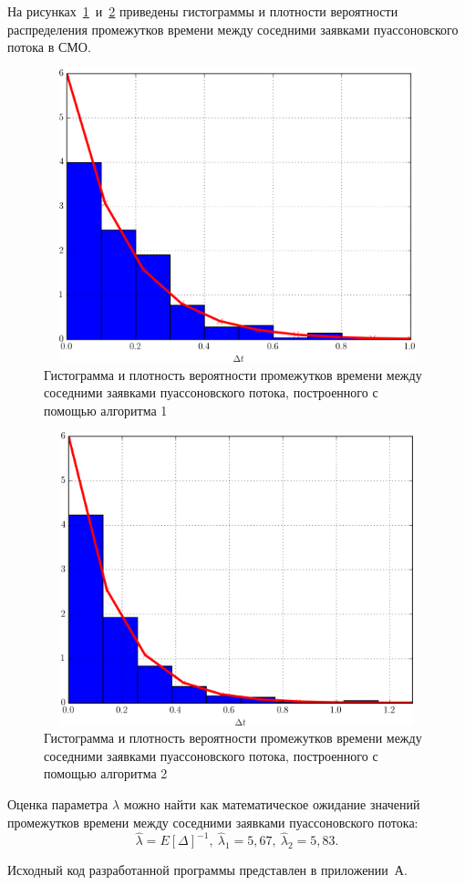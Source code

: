 На рисунках~\ref{pic:hist_1}~и~\ref{pic:hist_2} приведены гистограммы и плотности вероятности распределения промежутков времени между соседними заявками пуассоновского потока в СМО.

\begin{figure}[h!]
  \centering
  \includegraphics[width=150mm, height=85mm]{pic/hist_1}
  \caption{Гистограмма и плотность вероятности промежутков времени
    между соседними заявками пуассоновского потока,
    построенного с помощью алгоритма 1}
  \label{pic:hist_1}
\end{figure}

\begin{figure}[h!]
  \centering
  \includegraphics[width=150mm, height=85mm]{pic/hist_2}
  \caption{Гистограмма и плотность вероятности промежутков времени 
    между соседними заявками пуассоновского потока, 
    построенного с помощью алгоритма 2}
  \label{pic:hist_2}
\end{figure}

Оценка параметра $\lambda$ можно найти как математическое ожидание
значений промежутков времени между соседними заявками пуассоновского потока:
\begin{equation*}
  \hat{\lambda} = E[\Delta]^{-1}, \:
  \hat{\lambda}_1 = 5{,}67, \:
  \hat{\lambda}_2 = 5{,}83.
\end{equation*}

Исходный код разработанной программы представлен в приложении~А.